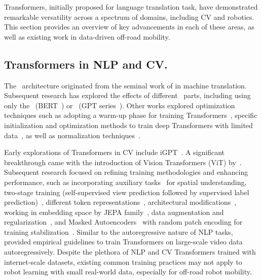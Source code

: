 Transformers, initially proposed for language translation task, have demonstrated remarkable versatility across a spectrum of domains, including CV and robotics. This section provides an overview of key advancements in each of these areas, as well as existing work in data-driven off-road mobility. 

\subsection{Transformers in NLP and CV.} 
The \tr~architecture originated from the seminal work of \citet{vaswani2017attention} in machine translation. Subsequent research has explored the effects of different \tr~parts, including using only the \encoder~(BERT~\cite{devlin2019bert}) or \decoder~(GPT series~\cite{radford2018improving, radford2019language, brown2020language}). Other works explored optimization techniques such as adopting a warm-up phase for training Transformers~\cite{xiong2020layer}, specific initialization and optimization methods to train deep Transformers with limited data~\cite{xu2021optimizing}, as well as normalization techniques~\cite{loshchilov2024ngpt}.

Early explorations of Transformers in CV include iGPT~\cite{chen2020generative}. A significant breakthrough came with the introduction of Vision Transformers (ViT) by~\citet{dosovitskiy2021image}. Subsequent research focused on refining training methodologies and enhancing performance, such as incorporating auxiliary tasks~\cite{liu2021efficient} for spatial understanding, two-stage training (self-supervised view prediction followed by supervised label prediction)~\cite{gani2022how}, different token representations~\cite{mao2022discrete}, architectural modifications~\cite{zhai2022scaling}, working in embedding space by JEPA family~\cite{assran2023self, bardes2023mcjepa, bardes2024revisiting}, data augmentation and regularization~\cite{steiner2022how}, and Masked Autoencoders~\cite{he2022masked} with random patch encoding for training stabilization~\cite{chen2021empirical}. Similar to the autoregressive nature of NLP tasks,~\citet{rajasegaran2025empirical} provided empirical guidelines to train Transformers on large-scale video data autoregressively.
Despite the plethora of NLP and CV Transformers trained with internet-scale datasets, existing common training practices may not apply to robot learning with small real-world data, especially for off-road robot mobility. 

